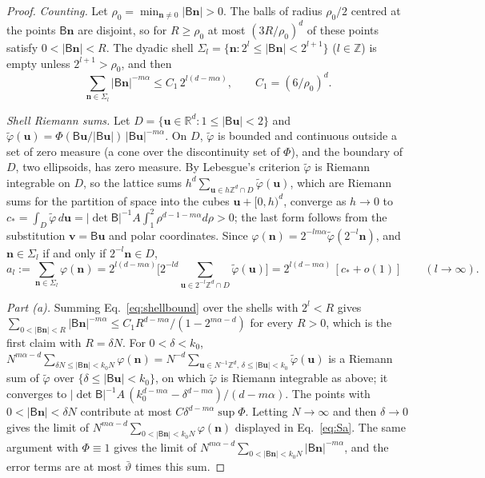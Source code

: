 \documentclass[aps,prb,10pt,onecolumn,amsmath,amssymb,superscriptaddress,nofootinbib]{revtex4-2}
\theoremstyle{plain}
\begin{document}
\begin{proof}
\emph{Counting.} Let $\rho_0=\min_{\mathbf n\ne0}|\mathsf B\mathbf n|>0$. The balls of radius $\rho_0/2$
centred at the points $\mathsf B\mathbf n$ are disjoint, so for $R\ge\rho_0$ at most $(3R/\rho_0)^d$ of these
points satisfy $0<|\mathsf B\mathbf n|<R$. The dyadic shell
$\Sigma_l=\{\mathbf n:2^l\le|\mathsf B\mathbf n|<2^{l+1}\}$ ($l\in\mathbb Z$) is empty unless
$2^{l+1}>\rho_0$, and then
\begin{equation}
\sum_{\mathbf n\in\Sigma_l}|\mathsf B\mathbf n|^{-m\alpha}\le C_1\,2^{l(d-m\alpha)},\qquad C_1=(6/\rho_0)^d .
\label{eq:shellbound}
\end{equation}

\emph{Shell Riemann sums.} Let $D=\{\mathbf u\in\mathbb R^d:1\le|\mathsf B\mathbf u|<2\}$ and
$\tilde\varphi(\mathbf u)=\Phi(\mathsf B\mathbf u/|\mathsf B\mathbf u|)\,|\mathsf B\mathbf u|^{-m\alpha}$. On
$D$, $\tilde\varphi$ is bounded and continuous outside a set of zero measure (a cone over the
discontinuity set of $\Phi$), and the boundary of $D$, two ellipsoids, has zero measure. By Lebesgue's
criterion $\tilde\varphi$ is Riemann integrable on $D$, so the lattice sums
$h^d\sum_{\mathbf u\in h\mathbb Z^d\cap D}\tilde\varphi(\mathbf u)$, which are Riemann sums for the
partition of space into the cubes $\mathbf u+[0,h)^d$, converge as $h\to0$ to
$c_\ast=\int_D\tilde\varphi\,d\mathbf u=|\det\mathsf B|^{-1}A\int_1^2\rho^{d-1-m\alpha}d\rho>0$; the last form
follows from the substitution $\mathbf v=\mathsf B\mathbf u$ and polar coordinates. Since
$\varphi(\mathbf n)=2^{-lm\alpha}\tilde\varphi(2^{-l}\mathbf n)$, and $\mathbf n\in\Sigma_l$ if and only if
$2^{-l}\mathbf n\in D$,
\begin{equation}
a_l:=\sum_{\mathbf n\in\Sigma_l}\varphi(\mathbf n)
=2^{l(d-m\alpha)}\Big[2^{-ld}\!\!\sum_{\mathbf u\in2^{-l}\mathbb Z^d\cap D}\!\!\tilde\varphi(\mathbf u)\Big]
=2^{l(d-m\alpha)}\,[c_\ast+o(1)]\qquad(l\to\infty).
\label{eq:shellsum}
\end{equation}

\emph{Part (a).} Summing Eq.~\eqref{eq:shellbound} over the shells with $2^l<R$ gives
$\sum_{0<|\mathsf B\mathbf n|<R}|\mathsf B\mathbf n|^{-m\alpha}\le C_1R^{d-m\alpha}/(1-2^{m\alpha-d})$ for every
$R>0$, which is the first claim with $R=\delta N$. For $0<\delta<k_0$,
$N^{m\alpha-d}\sum_{\delta N\le|\mathsf B\mathbf n|<k_0N}\varphi(\mathbf n)
=N^{-d}\sum_{\mathbf u\in N^{-1}\mathbb Z^d,\,\delta\le|\mathsf B\mathbf u|<k_0}\tilde\varphi(\mathbf u)$ is a Riemann
sum of $\tilde\varphi$ over $\{\delta\le|\mathsf B\mathbf u|<k_0\}$, on which $\tilde\varphi$ is Riemann
integrable as above; it converges to
$|\det\mathsf B|^{-1}A\,(k_0^{d-m\alpha}-\delta^{d-m\alpha})/(d-m\alpha)$. The points with
$0<|\mathsf B\mathbf n|<\delta N$ contribute at most $C\delta^{d-m\alpha}\sup\Phi$. Letting $N\to\infty$ and
then $\delta\to0$ gives the limit of $N^{m\alpha-d}\sum_{0<|\mathsf B\mathbf n|<k_0N}\varphi(\mathbf n)$
displayed in Eq.~\eqref{eq:Sa}. The same argument with $\Phi\equiv1$ gives the limit of
$N^{m\alpha-d}\sum_{0<|\mathsf B\mathbf n|<k_0N}|\mathsf B\mathbf n|^{-m\alpha}$, and the error terms are at
most $\bar\vartheta$ times this sum.


\end{proof}
\end{document}
